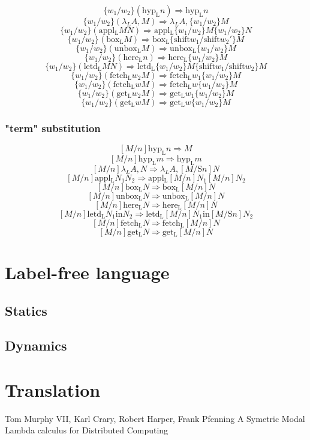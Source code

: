 \documentclass[12pt]{article}
\begin{document}
$$ \{ w_1 / w_2 \} (\mathrm{hyp_L} n) \Rightarrow \mathrm{hyp_L} n $$  
$$ \{ w_1 / w_2 \} (\lambda_L A, M) \Rightarrow \lambda_L A, \{w_1 / w_2 \} M $$  
$$ \{ w_1 / w_2 \} (\mathrm{appl_L} M N) \Rightarrow \mathrm{appl_L}  \{w_1 / w_2 \}M \{w_1 / w_2 \} N$$  
$$ \{ w_1 / w_2 \} (\mathrm{box_L} M) \Rightarrow 
			   \mathrm{box_L} \{\mathrm{shift} w_1 / \mathrm{shift} w_2' \} M $$  
$$ \{ w_1 / w_2 \} (\mathrm{unbox_L} M) \Rightarrow \mathrm{unbox_L} \{w_1 / w_2 \} M $$  
$$ \{ w_1 / w_2 \} (\mathrm{here_L} n) \Rightarrow \mathrm{here_L} \{w_1 / w_2 \} M $$  
$$ \{ w_1 / w_2 \} (\mathrm{letd_L} M N) \Rightarrow 
			    \mathrm{letd_L} \{w_1 / w_2 \}M \{\mathrm{shift} w_1 / \mathrm{shift} w_2 \} M$$  
$$ \{ w_1 / w_2 \} (\mathrm{fetch_L} w_2 M) \Rightarrow \mathrm{fetch_L} w_1 \{w_1 / w_2 \} M $$  
$$ \{ w_1 / w_2 \} (\mathrm{fetch_L} w M) \Rightarrow \mathrm{fetch_L} w \{w_1 / w_2 \} M $$  
$$ \{ w_1 / w_2 \} (\mathrm{get_L} w_2 M) \Rightarrow \mathrm{get_L} w_1 \{w_1 / w_2 \} M $$  
$$ \{ w_1 / w_2 \} (\mathrm{get_L} w M) \Rightarrow \mathrm{get_L} w \{w_1 / w_2 \} M $$ 

\subsubsection{"term" substitution}

$$ [ M / n ] \mathrm{hyp_L} n \Rightarrow M $$
$$ [ M / n ] \mathrm{hyp_L} m \Rightarrow \mathrm{hyp_L} m $$
$$ [ M / n ] \lambda_L A, N \Rightarrow \lambda_L A, [M / \mathrm{S } n] N$$
$$ [ M / n ] \mathrm{appl_L} N_1 N_2 \Rightarrow \mathrm{appl_L} [M / n] N_1 [M / n] N_2$$
$$ [ M / n ] \mathrm{box_L} N \Rightarrow \mathrm{box_L} [M / n] N $$
$$ [ M / n ] \mathrm{unbox_L} N \Rightarrow \mathrm{unbox_L} [M / n ]N $$
$$ [ M / n ] \mathrm{here_L} N \Rightarrow \mathrm{here_L} [M / n ]N $$
$$ [ M / n ] \mathrm{letd_L} N_1 \mathrm{in} N_2 \Rightarrow \mathrm{letd_L} [M / n ]N_1 \mathrm{ in } [M/\mathrm{S } n]N_2 $$
$$ [ M / n ] \mathrm{fetch_L} N \Rightarrow \mathrm{fetch_L} [M / n ]N $$
$$ [ M / n ] \mathrm{get_L} N \Rightarrow \mathrm{get_L} [M / n ]N $$

\section{Label-free language}
\subsection{Statics}
\subsection{Dynamics}

\section{Translation}

\begin{thebibliography}{9}
 	Tom Murphy VII, Karl Crary, Robert Harper, Frank Pfenning
	A Symetric Modal Lambda calculus for Distributed Computing
\end{thebibliography}
\end{document}
